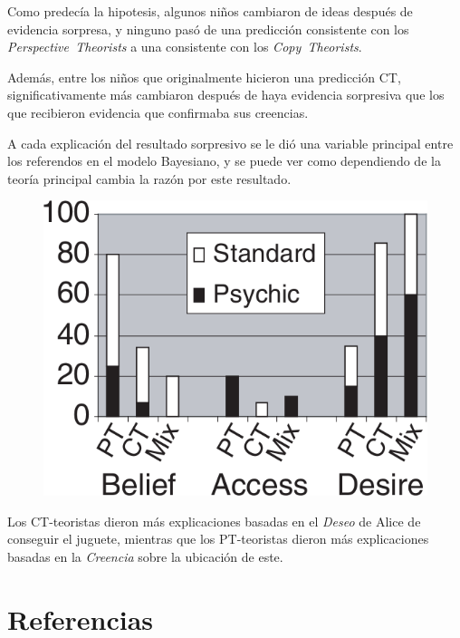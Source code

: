 \documentclass{beamer}
\begin{document}
\begin{frame}
Como predecía la hipotesis, algunos niños cambiaron de ideas después de evidencia sorpresa, y ninguno pasó de una predicción consistente con los \textit{Perspective~Theorists} a una consistente con los \textit{Copy~Theorists}.

Además, entre los niños que originalmente hicieron una predicción CT, significativamente más cambiaron después de haya evidencia sorpresiva que los que recibieron evidencia que confirmaba sus creencias.

\end{frame}

\begin{frame}
A cada explicación del resultado sorpresivo se le dió una variable principal entre los referendos en el modelo Bayesiano, y se puede ver como dependiendo de la teoría principal cambia la razón por este resultado.

\begin{figure}
\includegraphics[height=.45\textheight]{imagenes/resultados_belief.png}
\end{figure}

\vspace{-1em}

Los CT-teoristas dieron más explicaciones basadas en el \textit{Deseo} de Alice de conseguir el juguete, mientras que los PT-teoristas dieron más explicaciones basadas en la \textit{Creencia} sobre la ubicación de este.
\end{frame}

\section{Referencias}
\end{document}

